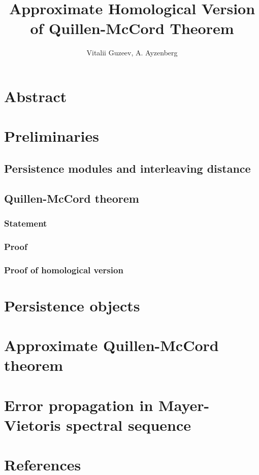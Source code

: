 \documentclass[a4paper, 12pt]{article}
\title{Approximate Homological Version of Quillen-McCord Theorem}
\author{Vitalii Guzeev, A. Ayzenberg}
\theoremstyle{definition}
\theoremstyle{remark}
\begin{document}
\section{Abstract}


\section{Preliminaries}

\subsection{Persistence modules and interleaving distance}


\subsection{Quillen-McCord theorem}

\subsubsection{Statement}


\subsubsection{Proof}


\subsubsection{Proof of homological version}


\section{Persistence objects}


\section{Approximate Quillen-McCord theorem}


\section{Error propagation in Mayer-Vietoris spectral sequence}


\section{References}

\end{document}
